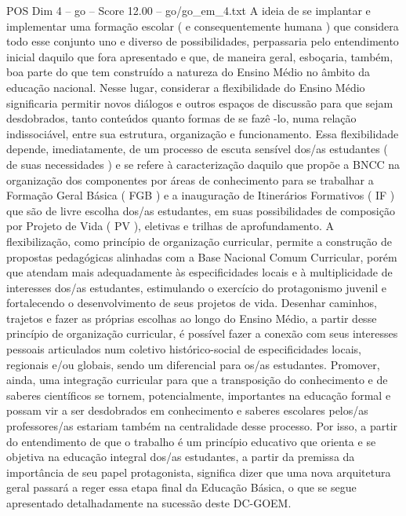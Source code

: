 \begin{textsample}{POS Dim 4 – go – Score 12.00 – go/go\_em\_4.txt}
A ideia de se implantar e implementar uma formação escolar ( e consequentemente humana ) que considera todo esse conjunto uno e diverso de possibilidades, perpassaria pelo entendimento inicial daquilo que fora apresentado e que, de maneira geral, esboçaria, também, boa parte do que tem construído a natureza do Ensino Médio no âmbito da educação nacional.
Nesse lugar, considerar a flexibilidade do Ensino Médio significaria permitir novos diálogos e outros espaços de discussão para que sejam desdobrados, tanto conteúdos quanto formas de se fazê -lo, numa relação indissociável, entre sua estrutura, organização e funcionamento.
Essa flexibilidade depende, imediatamente, de um processo de escuta sensível dos/as estudantes ( de suas necessidades ) e se refere à caracterização daquilo que propõe a BNCC na organização dos componentes por áreas de conhecimento para se trabalhar a Formação Geral Básica ( FGB ) e a inauguração de Itinerários Formativos ( IF ) que são de livre escolha dos/as estudantes, em suas possibilidades de composição por Projeto de Vida ( PV ), eletivas e trilhas de aprofundamento.
A flexibilização, como princípio de organização curricular, permite a construção de propostas pedagógicas alinhadas com a Base Nacional Comum Curricular, porém que atendam mais adequadamente às especificidades locais e à multiplicidade de interesses dos/as estudantes, estimulando o exercício do protagonismo juvenil e fortalecendo o desenvolvimento de seus projetos de vida.
Desenhar caminhos, trajetos e fazer as próprias escolhas ao longo do Ensino Médio, a partir desse princípio de organização curricular, é possível fazer a conexão com seus interesses pessoais articulados num coletivo histórico-social de especificidades locais, regionais e/ou globais, sendo um diferencial para os/as estudantes.
Promover, ainda, uma integração curricular para que a transposição do conhecimento e de saberes científicos se tornem, potencialmente, importantes na educação formal e possam vir a ser desdobrados em conhecimento e saberes escolares pelos/as professores/as estariam também na centralidade desse processo.
Por isso, a partir do entendimento de que o trabalho é um princípio educativo que orienta e se objetiva na educação integral dos/as estudantes, a partir da premissa da importância de seu papel protagonista, significa dizer que uma nova arquitetura geral passará a reger essa etapa final da Educação Básica, o que se segue apresentado detalhadamente na sucessão deste DC-GOEM.

\end{textsample}
